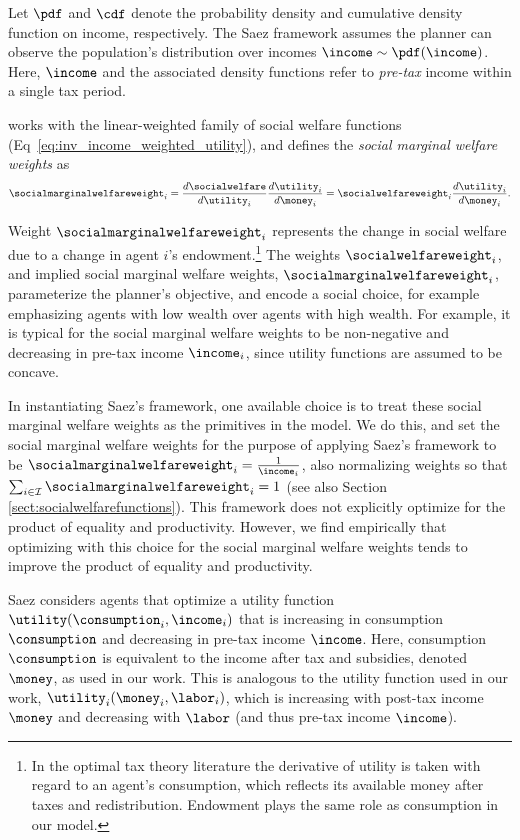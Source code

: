 Let $\pdf$ and $\cdf$ denote the probability density and cumulative density function on income, respectively.
The Saez framework assumes the planner can observe the population's distribution over incomes $\income\sim\pdf(\income)$.
Here, $\income$ and the associated density functions refer to \textit{pre-tax} income within a single tax period.

\cite{saez_using_2001} works with the linear-weighted family of social welfare functions (Eq~\ref{eq:inv_income_weighted_utility}), and defines the {\em social marginal welfare weights} as
\begin{align}\socialmarginalwelfareweight_i = \frac{d\socialwelfare}{d\utility_i}\frac{d\utility_i}{d\money_i} = \socialwelfareweight_i \frac{d\utility_i}{d\money_i}.
\end{align}

Weight $\socialmarginalwelfareweight_i$ represents the change in social welfare due to a change in agent $i$'s endowment.\footnote{In the optimal tax theory literature the derivative of utility is taken with regard to an agent's consumption, which reflects its available money after taxes and redistribution. Endowment plays the same role as consumption in our model.}
The weights $\socialwelfareweight_i$, and implied social marginal welfare weights, $\socialmarginalwelfareweight_i$, parameterize the planner's objective, and encode a social choice, for example emphasizing agents with low wealth over agents with high wealth.
For example, it is typical for
the social marginal welfare weights  to be non-negative and decreasing in pre-tax income $\income_i$, since utility functions are assumed to be concave.

\fi
In instantiating Saez's framework, %
one available choice is to treat these social marginal welfare weights as the primitives in the model.
We do this, and  set the social marginal welfare  weights for the purpose of applying Saez's framework to be $\socialmarginalwelfareweight_i = \frac{1}{\income_i}$, also normalizing weights so that  $\sum_{i\in\mathcal{I}}\socialmarginalwelfareweight_i = 1$ (see also Section \ref{sect:socialwelfarefunctions}).
This  framework  does not explicitly optimize for the product of
equality and productivity. However, we  find empirically that optimizing with this choice for the social marginal welfare
weights tends to improve the product of equality and productivity.

Saez considers agents that optimize a utility function $\utility(\consumption_i, \income_i)$ that is increasing in consumption $\consumption$ and decreasing in pre-tax income $\income$. Here, consumption $\consumption$ is equivalent to the income after tax and subsidies, denoted $\money$, as used in our work. This is analogous to the utility function used in our work, $\utility_i(\money_i, \labor_i)$, which is increasing with post-tax income $\money$ and decreasing with $\labor$ (and thus pre-tax income $\income$).\fi




